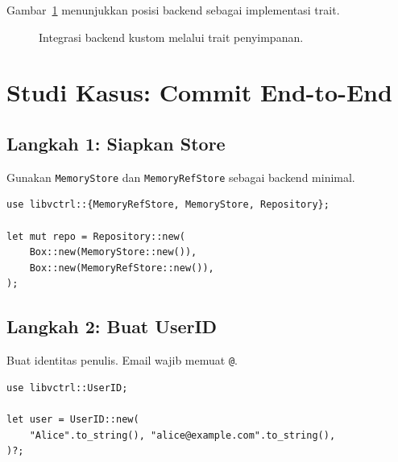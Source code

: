 \documentclass[11pt,a4paper]{article}
\begin{document}
Gambar~\ref{fig:backend} menunjukkan posisi backend sebagai implementasi trait.

\begin{figure}[H]
	\centering
	\caption{Integrasi backend kustom melalui trait penyimpanan.}
	\label{fig:backend}
\end{figure}

\section{Studi Kasus: Commit End-to-End}

\subsection{Langkah 1: Siapkan Store}

Gunakan \texttt{MemoryStore} dan \texttt{MemoryRefStore} sebagai backend minimal.

\begin{lstlisting}[style=code]
use libvctrl::{MemoryRefStore, MemoryStore, Repository};

let mut repo = Repository::new(
    Box::new(MemoryStore::new()),
    Box::new(MemoryRefStore::new()),
);
\end{lstlisting}

\subsection{Langkah 2: Buat UserID}

Buat identitas penulis. Email wajib memuat \texttt{@}.

\begin{lstlisting}[style=code]
use libvctrl::UserID;

let user = UserID::new(
    "Alice".to_string(), "alice@example.com".to_string(),
)?;
\end{lstlisting}
\end{document}
